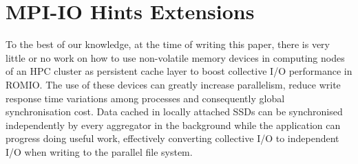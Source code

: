 \section{MPI-IO Hints Extensions}
\label{sec: e10-extensions}

To the best of our knowledge, at the time of writing this paper, there is very little or no work on how to use non-volatile memory devices in computing nodes of an HPC cluster as persistent cache layer to boost collective I/O performance in ROMIO. The use of these devices can greatly increase parallelism, reduce write response time variations among processes and consequently global synchronisation cost. Data cached in locally attached SSDs can be synchronised independently by every aggregator in the background while the application can progress doing useful work, effectively converting collective I/O to independent I/O when writing to the parallel file system.
\begin{table}[!htb]
\centering
\caption{Proposed MPI-IO hints extensions.}
\label{table: hints_table}
\end{table}

